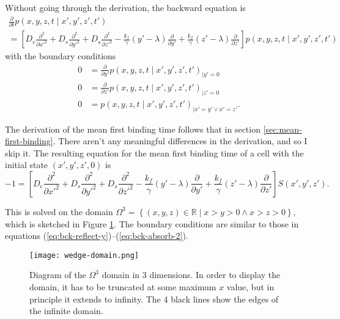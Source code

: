 \documentclass{article}
\newcommand{\stiff}{\frac{k_f}{\gamma}}
\newcommand{\Pder}[2]{\frac{\partial #1}{\partial #2}}
\def\R{\mathbb{R}}
\begin{document}
Without going through the derivation, the backward equation is
\begin{multline}
  \label{eq:backward-2}
  \Pder{}{t}p(x, y, z, t \mid x', y', z', t') \\
  = \left[D_c \frac{\partial^2}{\partial x'^2} + D_s
    \frac{\partial^2}{\partial y'^2} + D_s \frac{\partial^2}{\partial
      z'^2} - \stiff (y' - \lambda) \Pder{}{y'}  + \stiff (z' -
    \lambda) \Pder{}{z'}\right] p(x, y, z, t \mid x', y', z', t')
\end{multline}
with the boundary conditions
\begin{align}
  \label{eq:bck-reflect-y}
  0 &= \frac{\partial}{\partial y'} p(x, y, z, t \mid x', y', z',
      t')_{|y'=0} \\
  \label{eq:bck-reflect-z}
  0 &= \frac{\partial}{\partial z'} p(x, y, z, t \mid x', y', z',
      t')_{|z'=0} \\
  \label{eq:bck-absorb-2}
  0 &= p(x, y, z, t \mid x', y', z', t')_{|x'=y' \vee x'=z'}.
\end{align}

The derivation of the mean first binding time follows that in section
\ref{sec:mean-first-binding}. There aren't any meaningful differences
in the derivation, and so I skip it. The resulting equation for the
mean first binding time of a cell with the initial state $(x', y', z',
0)$ is
\begin{equation}
  \label{eq:mfbt}
  -1 = \left[D_c \frac{\partial^2}{\partial x'^2} + D_s \frac{\partial^2}{\partial
      y'^2} + D_s \frac{\partial^2}{\partial z'^2} - \stiff (y' -
    \lambda) \Pder{}{y'}  + \stiff (z' - \lambda) \Pder{}{z'}\right]
  S(x', y', z').
\end{equation}

This is solved on the domain $\Omega^3 = \left\{(x, y, z) \in \R \mid x >
  y > 0 \wedge x > z > 0 \right\}$, which is sketched in Figure
\ref{fig:wedge-domain}. The boundary conditions are similar to those
in equations (\ref{eq:bck-reflect-y})--(\ref{eq:bck-absorb-2}).

\begin{figure}
  \centering
  \texttt{[image: wedge-domain.png]}
  \caption[Diagram of $\Omega^3$]{Diagram of the $\Omega^3$ domain in 3
    dimensions. In order to display the domain, it has to be truncated
    at some maximum $x$ value, but in principle it extends to
    infinity. The 4 black lines show the edges of the infinite
    domain.}
  \label{fig:wedge-domain}
\end{figure}
\end{document}
